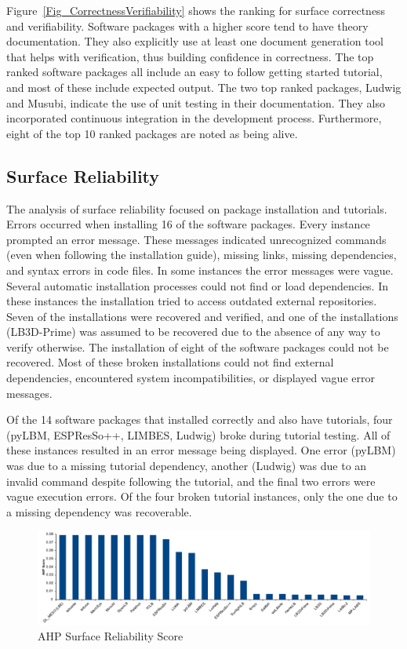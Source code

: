 \documentclass[final, 3p, times, authoryear]{elsarticle}
\begin{document}
Figure~\ref{Fig_CorrectnessVerifiability} shows the ranking for surface
correctness and verifiability. Software packages with a higher score tend to
have theory documentation. They also explicitly use at least one document
generation tool that helps with verification, thus building confidence in
correctness. The top ranked software packages all include an easy to follow
getting started tutorial, and most of these include expected output. The two top
ranked packages, Ludwig and Musubi, indicate the use of unit testing in their
documentation. They also incorporated continuous integration in the development
process. Furthermore, eight of the top 10 ranked packages are noted as being
alive.

\subsection{Surface Reliability}

The analysis of surface reliability focused on package installation and
tutorials. Errors occurred when installing 16 of the software packages. Every
instance prompted an error message. These messages indicated unrecognized
commands (even when following the installation guide), missing links, missing
dependencies, and syntax errors in code files. In some instances the error
messages were vague. Several automatic installation processes could not find or
load dependencies. In these instances the installation tried to access outdated
external repositories. Seven of the installations were recovered and verified,
and one of the installations (LB3D-Prime) was assumed to be recovered due to the
absence of any way to verify otherwise. The installation of eight of the software
packages could not be recovered. Most of these broken installations could not
find external dependencies, encountered system incompatibilities, or displayed
vague error messages.

Of the 14 software packages that installed correctly and also have tutorials,
four (pyLBM, ESPResSo++, LIMBES, Ludwig) broke during tutorial testing. All of
these instances resulted in an error message being displayed. One error (pyLBM)
was due to a missing tutorial dependency, another (Ludwig) was due to an invalid
command despite following the tutorial, and the final two errors were vague
execution errors. Of the four broken tutorial instances, only the one due to a missing dependency was recoverable. 

\begin{figure}[h!]
	\begin{center}
		\includegraphics[width=1.0\textwidth]{./figures/reliability_chart.pdf}
		\caption{AHP Surface Reliability Score}
		\label{Fig_Reliability}
	\end{center}
\end{figure}
\end{document}
